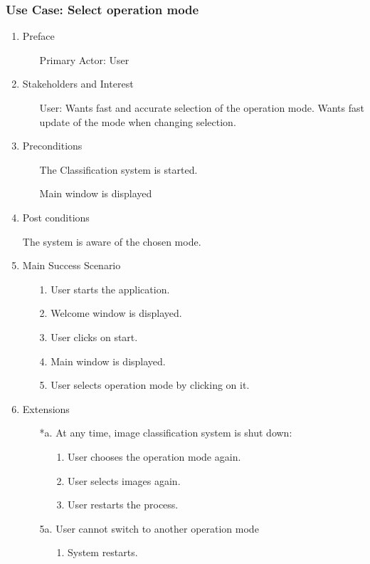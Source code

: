 \documentclass[parskip=full]{scrartcl}
\begin{document}
\pagebreak

\subsubsection {Use Case: Select operation mode}

\begin{enumerate}
	\item Preface
	\begin{itemize} [nosep]
		\item[] Primary Actor: User
	\end{itemize}
	\item Stakeholders and Interest
	\begin{itemize} [nosep]
		\item[] User: Wants fast and accurate selection of the operation mode. Wants fast update of the mode when changing selection.
	\end{itemize}
	\item Preconditions
	\begin{itemize} [nosep]
		\item[] The Classification system is started.
		\item[] Main window is displayed
	\end{itemize}
	\item Post conditions
	\begin{itemize} [nosep]
		The system is aware of the chosen mode.
	\end{itemize}
	\item Main Success Scenario
	\begin{itemize} [nosep]
		\item[1.] User starts the application.
		\item[2.] Welcome window is displayed.
		\item[3.] User clicks on start.
		\item[4.] Main window is displayed.
		\item[5.] User selects operation mode by clicking on it.
	\end{itemize}
	\item Extensions
	\begin{itemize} [nosep]
		\item[*a.] At any time, image classification system is shut down:
		\begin{itemize} [nosep]
			\item[1.] User chooses the operation mode again.
			\item[2.] User selects images again.
			\item[3.] User restarts the process.
		\end{itemize}
		\item[5a.] User cannot switch to another operation mode
		\begin{itemize} [nosep]
			\item[1.] System restarts.
		\end{itemize}
	\end{itemize}
\end{enumerate}
\end{document}
